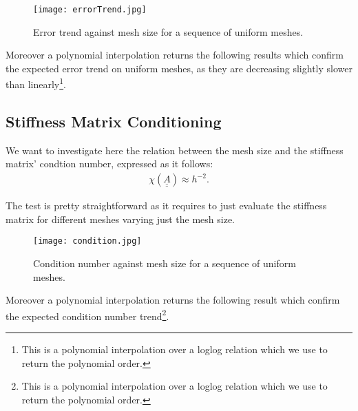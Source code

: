 \begin{figure}[!ht]
	\centering
	\texttt{[image: errorTrend.jpg]}
	\caption{Error trend against mesh size for a sequence of uniform meshes.}
\end{figure}

\newpage
\noindent Moreover a polynomial interpolation returns the following results which confirm the expected error trend on uniform meshes, as they are decreasing slightly slower than linearly\footnote{This is a polynomial interpolation over a loglog relation which we use to return the polynomial order.}.



\newpage
\subsection{Stiffness Matrix Conditioning}

We want to investigate here the relation between the mesh size and the stiffness matrix' condtion number, expressed as it follows:
\begin{gather}
	\chi(\underline{\underline{A}}) \approx h^{-2}.
\end{gather}

The test is pretty straightforward as it requires to just evaluate the stiffness matrix for different meshes varying just the mesh size.

\begin{figure}[!ht]
	\centering
	\texttt{[image: condition.jpg]}
	\caption{Condition number against mesh size for a sequence of uniform meshes.}
\end{figure}

\newpage
\noindent Moreover a polynomial interpolation returns the following result which confirm the expected condition number trend\footnote{This is a polynomial interpolation over a loglog relation which we use to return the polynomial order.}.

